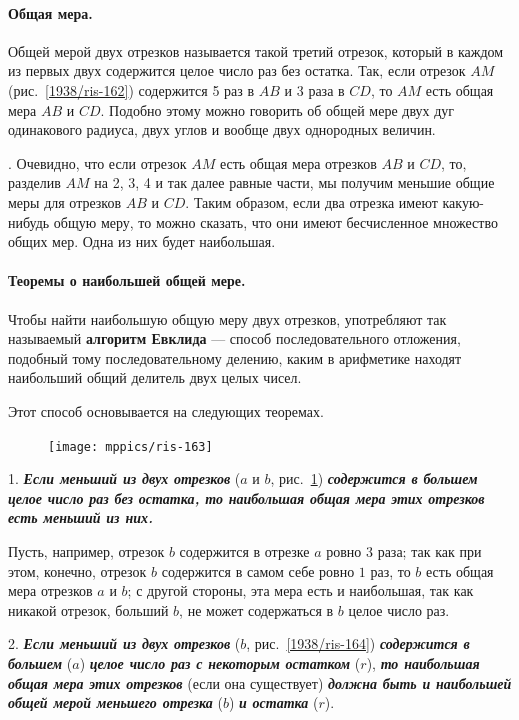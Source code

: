 \documentclass[oneside]{book}
\makeatletter
\newcommand{\rindex}[2][\imki@jobname]{%
  \index[#1]{\detokenize{#2}}%
}
\makeatother
\begin{document}
\paragraph{Общая мера.}\label{1938/145}
Общей мерой двух отрезков называется такой третий отрезок, который в каждом из первых двух содержится целое число раз без остатка.
Так, если отрезок $AM$ (рис.~\ref{1938/ris-162}) содержится 5 раз в $AB$ и 3 раза в $CD$, то $AM$ есть общая мера $AB$ и $CD$.
Подобно этому можно говорить об общей мере двух дуг одинакового радиуса, двух углов и вообще двух однородных величин.

\smallskip
{}.
Очевидно, что если отрезок $AM$ есть общая мера
отрезков $AB$ и $CD$, то, разделив $AM$ на 2, 3, 4 и так далее равные
части, мы получим меньшие общие меры для отрезков $AB$ и $CD$.
Таким образом, если два отрезка имеют какую-нибудь общую меру, то можно сказать, что они имеют бесчисленное множество общих мер.
Одна из них будет наибольшая.

\paragraph{Теоремы о наибольшей общей мере.}\label{1938/146}
Чтобы найти наибольшую общую меру двух отрезков, употребляют так называемый \rindex{алгоритм Евклида}\textbf{алгоритм Евклида} — способ последовательного отложения, подобный тому последовательному делению, каким в арифметике находят наибольший общий делитель двух целых чисел. 

Этот способ основывается на следующих теоремах.

\begin{figure}
\centering
\texttt{[image: mppics/ris-163]}
\caption{}\label{1938/ris-163}
\end{figure}

1.
\textbf{\emph{Если меньший из двух отрезков}} ($a$ и $b$, рис.~\ref{1938/ris-163}) \textbf{\emph{содержится в большем целое число раз без остатка, то наибольшая общая мера этих отрезков есть меньший из них.}}

Пусть, например, отрезок $b$ содержится в отрезке $a$ ровно $3$ раза;
так как при этом, конечно, отрезок $b$ содержится в самом себе ровно $1$ раз, то $b$ есть общая мера отрезков $a$ и $b$;
с другой стороны, эта мера есть и наибольшая, так как никакой отрезок, больший $b$, не может содержаться в $b$ целое число раз.

2.
\textbf{\emph{Если меньший из двух отрезков}} ($b$, рис.~\ref{1938/ris-164}) \textbf{\emph{содержится в большем}} ($a$) \textbf{\emph{целое число раз с некоторым остатком}} ($r$), \textbf{\emph{то наибольшая общая мера этих отрезков}} (если она существует) \textbf{\emph{должна быть и наибольшей общей мерой меньшего отрезка}} ($b$) \textbf{\emph{и остатка}} ($r$).
\end{document}
